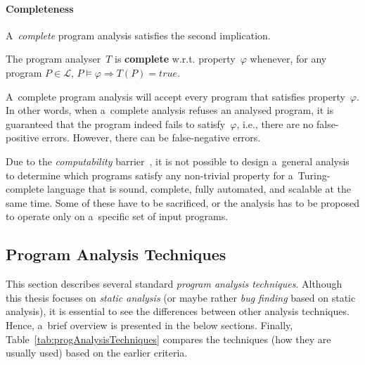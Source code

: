 \paragraph{Completeness}
A~\emph{complete} program analysis satisfies the second implication.
\begin{definition}
    The program analyser~$ T $ is \textbf{complete} w.r.t. property~$ \varphi $ whenever, for any program $ P \in \mathcal{L} $, $ P \models \varphi \Longrightarrow T(P) = true $.
\end{definition}
A~complete program analysis will accept every program that satisfies property~$ \varphi $. In other words, when a~complete analysis refuses an analysed program, it is guaranteed that the program indeed fails to satisfy~$ \varphi $, i.e., there are no false-positive errors. However, there can be false-negative errors.

Due to the \emph{computability} barrier~\cite{rice}, it is not possible to design a~general analysis to determine which programs satisfy any non-trivial property for a~Turing-complete language that is sound, complete, fully automated, and scalable at the same time. Some of these have to be sacrificed, or the analysis has to be proposed to operate only on a~specific set of input programs.

\subsection{Program Analysis Techniques}
\label{sec:analysisTechniques}

This section describes several standard \emph{program analysis techniques}. Although this thesis focuses on \emph{static analysis} (or maybe rather \emph{bug finding} based on static analysis), it is essential to see the differences between other analysis techniques. Hence, a~brief overview is presented in the below sections. Finally, Table~\ref{tab:progAnalysisTechniques} compares the techniques (how they are usually used) based on the earlier criteria.

